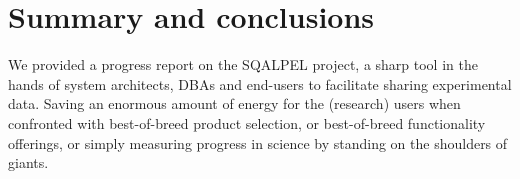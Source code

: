 \documentclass{cidr-2019}
\begin{document}



\section{Summary and conclusions}\label{Summary and conclusions}

We provided a progress report on the {\sc SQALPEL} project, a sharp tool in the
hands of system architects, DBAs and end-users to facilitate sharing experimental data. 
Saving an enormous amount of energy for the (research) users when confronted with best-of-breed product
selection, or best-of-breed functionality offerings, or simply measuring progress in science
by standing on the shoulders of giants.




\end{document}
